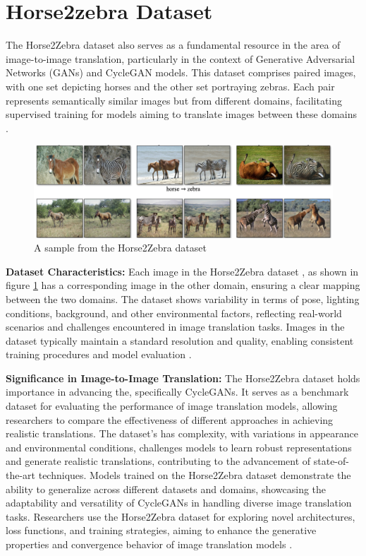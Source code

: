 \documentclass[UKenglish,12pt]{master-style}
\begin{document}
\section{Horse2zebra Dataset}

The Horse2Zebra dataset also serves as a fundamental resource in the area of image-to-image translation, particularly in the context of Generative Adversarial Networks (GANs) and CycleGAN models. This dataset comprises paired images, with one set depicting horses and the other set portraying zebras. Each pair represents semantically similar images but from different domains, facilitating supervised training for models aiming to translate images between these domains \cite{unpaired_horse2zebra_cyclgan}.


\begin{figure}[ht]
    \centering
    \includegraphics[width=1\textwidth]{Images/horse2zebra.png}
    \caption{A sample from the Horse2Zebra dataset}
    \label{fig:horse2zebra}
\end{figure}

\textbf{Dataset Characteristics:} Each image in the Horse2Zebra dataset , as shown in figure \ref{fig:horse2zebra} has a corresponding image in the other domain, ensuring a clear mapping between the two domains. The dataset shows variability in terms of pose, lighting conditions, background, and other environmental factors, reflecting real-world scenarios and challenges encountered in image translation tasks. Images in the dataset typically maintain a standard resolution and quality, enabling consistent training procedures and model evaluation \cite{unpaired_horse2zebra_cyclgan}.

\textbf{Significance in Image-to-Image Translation: }The Horse2Zebra dataset holds importance in advancing the, specifically CycleGANs. It serves as a benchmark dataset for evaluating the performance of image translation models, allowing researchers to compare the effectiveness of different approaches in achieving realistic translations. The dataset's has complexity, with variations in appearance and environmental conditions, challenges models to learn robust representations and generate realistic translations, contributing to the advancement of state-of-the-art techniques. Models trained on the Horse2Zebra dataset demonstrate the ability to generalize across different datasets and domains, showcasing the adaptability and versatility of CycleGANs in handling diverse image translation tasks. Researchers use the Horse2Zebra dataset for exploring novel architectures, loss functions, and training strategies, aiming to enhance the generative properties and convergence behavior of image translation models \cite{unpaired_horse2zebra_cyclgan}.
\end{document}
